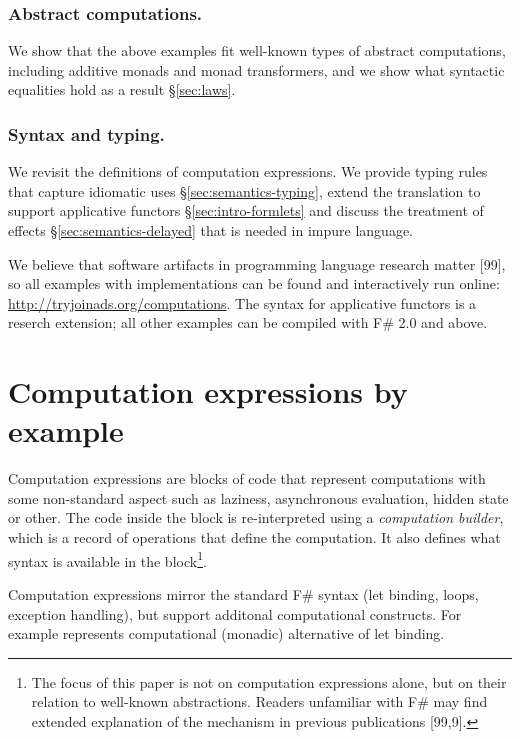 \documentclass[runningheads,a4paper]{llncs}
\begin{document}
\vspace{-1em}
\subsubsection{Abstract computations.} We show that the above examples fit well-known types
of abstract computations, including additive monads and monad transformers, and we show what 
syntactic equalities hold as a result \S\ref{sec:laws}.

\vspace{-1em}
\subsubsection{Syntax and typing.} We revisit the definitions of computation expressions. We provide
typing rules that capture idiomatic uses \S\ref{sec:semantics-typing}, extend the translation
to support applicative functors \S\ref{sec:intro-formlets} and discuss the treatment of effects
\S\ref{sec:semantics-delayed} that is needed in impure language.

\vspace{1em}
\noindent
We believe that software artifacts in programming language research matter [99], so all examples 
with implementations can be found and interactively run online: \url{http://tryjoinads.org/computations}. 
The syntax for applicative functors is a reserch extension; all other examples can be 
compiled with F\# 2.0 and above.


\section{Computation expressions by example}
\label{sec:intro}

Computation expressions are blocks of code that represent computations with some non-standard 
aspect such as laziness, asynchronous evaluation, hidden state or other. The code inside the
block is re-interpreted using a \emph{computation builder}, which is a record of operations that 
define the computation. It also defines what syntax is available in the block\footnote{The focus 
of this paper is not on computation expressions alone, but on their relation to well-known 
abstractions. Readers unfamiliar with F\# may find extended explanation of the mechanism 
in previous publications [99,9].}.

Computation expressions mirror the standard F\# syntax (let binding, loops, exception handling),
but support additonal computational constructs. For example  represents computational 
(monadic) alternative of let binding.
\end{document}
